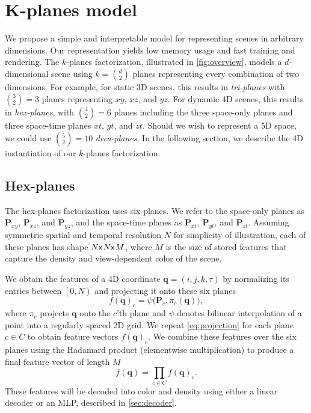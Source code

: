 \documentclass[10pt,twocolumn,letterpaper]{article}
\newcommand*{\x}{\mathsf{x}\mskip1mu}
\newcommand{\modelname}{$k$-planes}
\begin{document}
 \section{K-planes model}
\label{sec:method}


We propose a simple and interpretable model for representing scenes in arbitrary dimensions. 
Our representation yields low memory usage and fast training and rendering. 
The \modelname{} factorization, illustrated in \cref{fig:overview}, models a $d$-dimensional scene using $k = \binom{d}{2}$ planes representing every combination of two dimensions. For example, for static 3D scenes, this results in \emph{tri-planes} with $\binom{3}{2} = 3$ planes representing $xy$, $xz$, and $yz$. For dynamic 4D scenes, this results in \emph{hex-planes}, with $\binom{4}{2} = 6$ planes including the three space-only planes and three space-time planes $xt$, $yt$, and $zt$. Should we wish to represent a 5D space, we could use $\binom{5}{2} = 10$ \emph{deca-planes}. In the following section, we describe the 4D instantiation of our \modelname{} factorization. 


\subsection{Hex-planes}\label{sec:kplane}


The hex-planes factorization uses six planes. We refer to the space-only planes as $\textbf{P}_{xy}$, $\textbf{P}_{xz}$, and $\textbf{P}_{yz}$, and the space-time planes as $\textbf{P}_{xt}$, $\textbf{P}_{yt}$, and $\textbf{P}_{zt}$. Assuming symmetric spatial and temporal resolution $N$ for simplicity of illustration, each of these planes has shape $N \x N \x M$, where $M$ is the size of stored features that capture the density and view-dependent color of the scene. 

We obtain the features of a 4D coordinate $\bm{q} = (i, j, k, \tau)$ by normalizing its entries between $\left[0, N\right)$ and projecting it onto these six planes 
\begin{equation}\label{eq:projection}
    f(\bm{q})_c = \psi\big(\textbf{P}_c, \pi_c(\bm{q})\big),
\end{equation}
where $\pi_c$ projects $\bm{q}$ onto the $c$'th plane and $\psi$ denotes bilinear interpolation of a point into a regularly spaced 2D grid. We repeat \cref{eq:projection} for each plane $c\in C$ to obtain feature vectors $f(\bm{q})_c$. We combine these features over the six planes using the Hadamard product (elementwise multiplication) to produce a final feature vector of length $M$
\begin{equation}\label{eq:contraction}
    f(\bm{q}) = \prod_{c\in C} f(\bm{q})_c.
\end{equation}
These features will be decoded into color and density using either a linear decoder or an MLP, described in \cref{sec:decoder}.
\end{document}
